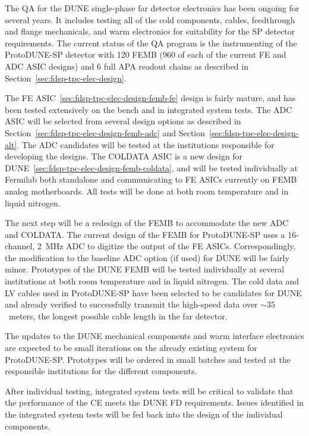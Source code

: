The QA for the DUNE single-phase far detector electronics has been ongoing for several years. It includes testing all of the cold components, cables, feedthrough and flange mechanicals, and warm electronics for suitability for the SP detector requirements. The current status of the QA program is the instrumenting of the ProtoDUNE-SP detector with 120 FEMB (960 of each of the current FE and ADC ASIC designs) and 6 full APA readout chains as described in Section~\ref{sec:fdsp-tpc-elec-design}.


The FE ASIC~\ref{sec:fdsp-tpc-elec-design-femb-fe} design is fairly mature, and has been tested extensively on the bench and in integrated system tests. The ADC ASIC will be selected from several design options as described in Section~\ref{sec:fdsp-tpc-elec-design-femb-adc} and Section~\ref{sec:fdsp-tpc-elec-design-alt}. The ADC candidates will be tested at the institutions responsible for developing the designs. The COLDATA ASIC is a new design for DUNE~\ref{sec:fdsp-tpc-elec-design-femb-coldata}, and will be tested individually at Fermilab both standalone and communicating to FE ASICs currently on FEMB analog motherboards. All tests will be done at both room temperature and in liquid nitrogen.

The next step will be a redesign of the FEMB to accommodate the new ADC and COLDATA. The current design of the FEMB for ProtoDUNE-SP uses a 16-channel, 2~MHz ADC to digitize the output of the FE ASICs. Correspondingly, the modification to the baseline ADC option (if used) for DUNE will be fairly minor. Prototypes of the DUNE FEMB will be tested individually at several institutions at both room temperature and in liquid nitrogen. The cold data and LV cables used in ProtoDUNE-SP have been selected to be candidates for DUNE and already verified to successfully transmit the high-speed data over $\sim35$~meters, the longest possible cable length in the far detector.

The updates to the DUNE mechanical components and warm interface electronics are expected to be small iterations on the already existing system for ProtoDUNE-SP. Prototypes will be ordered in small batches and tested at the responsible institutions for the different components.

After individual testing, integrated system tests will be critical to validate that the performance of the CE meets the DUNE FD requirements. Issues identified in the integrated system tests will be fed back into the design of the individual components.
